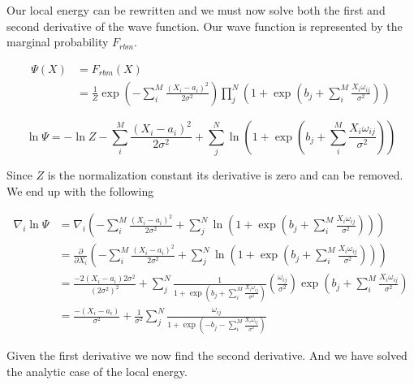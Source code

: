 Our local energy can be rewritten and we must now solve both the first and second derivative of the wave function. Our wave function is represented by the marginal probability $F_{rbm}$.

\begin{align*}
\Psi(X) &= F_{rbm}(X) \\
&= \frac{1}{Z} \exp \left( -\sum_{i}^{M} \frac{(X_i - a_i)^2}{2 \sigma^2} \right) \prod_{j}^{N} \left( 1 + \exp \left( b_j + \sum_{i}^{M} \frac{X_i \omega_{ij}}{\sigma^2} \right) \right)
\end{align*}


\begin{equation*}
\ln \Psi = -\ln Z - \sum_{i}^{M} \frac{(X_i - a_i)^2}{2 \sigma^2} +  \sum_{j}^{N} \ln \left(1 + \exp \left( b_j + \sum_{i}^{M} \frac{X_i \omega_{ij}}{\sigma^2} \right) \right)
\end{equation*}

Since $Z$ is the normalization constant its derivative is zero and can be removed.
We end up with the following

\begin{align*}
\nabla_i \ln \Psi &= \nabla_i \left( - \sum_{i}^{M} \frac{(X_i - a_i)^2}{2 \sigma^2} +  \sum_{j}^{N} \ln \left( 1 + \exp \left( b_j + \sum_{i}^{M} \frac{X_i \omega_{ij}}{\sigma^2} \right) \right) \right) \\
&= \frac{\partial}{\partial X_i} \left( - \sum_{i}^{M} \frac{(X_i - a_i)^2}{2 \sigma^2} +  \sum_{j}^{N} \ln \left(1 + \exp \left( b_j + \sum_{i}^{M} \frac{X_i \omega_{ij}}{\sigma^2} \right) \right) \right)\\
&= \frac{-2 (X_i - a_i) 2 \sigma^2}{(2 \sigma^2)^2} + \sum_{j}^{N} \frac{1}{1 + \exp \left( b_j + \sum_{i}^{M} \frac{X_i \omega_{ij}}{\sigma^2} \right)} \left( \frac{\omega_{ij}}{\sigma^2} \right) \exp \left(  b_j + \sum_{i}^{M} \frac{X_i \omega_{ij}}{\sigma^2} \right) \\
&= \frac{-(X_i - a_i)}{\sigma^2} + \frac{1}{\sigma^2}\sum_{j}^{N} \frac{\omega_{ij}}{1 + \exp \left( -b_j - \sum_{i}^{M} \frac{X_i \omega_{ij}}{\sigma^2} \right)}
\end{align*}

Given the first derivative we now find the second derivative. And we have solved the analytic case of the local energy.

